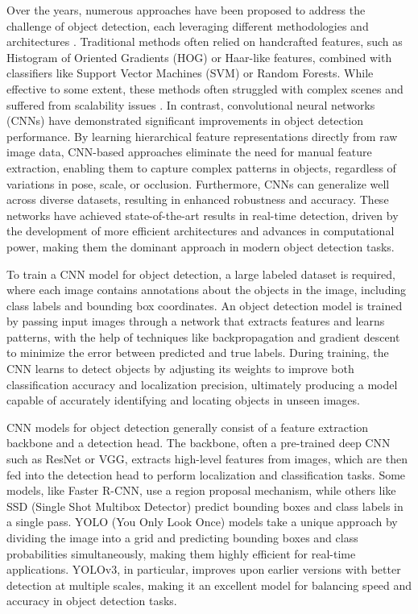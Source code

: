 \documentclass[journal,onecolumn,12pt]{IEEEtran}
\begin{document}
Over the years, numerous approaches have been proposed to address the challenge of object detection, each leveraging different methodologies and architectures \cite{zou2023object}. Traditional methods often relied on handcrafted features, such as Histogram of Oriented Gradients (HOG) or Haar-like features, combined with classifiers like Support Vector Machines (SVM) or Random Forests. While effective to some extent, these methods often struggled with complex scenes and suffered from scalability issues \cite{10099639}. In contrast, convolutional neural networks (CNNs) have demonstrated significant improvements in object detection performance. By learning hierarchical feature representations directly from raw image data, CNN-based approaches eliminate the need for manual feature extraction, enabling them to capture complex patterns in objects, regardless of variations in pose, scale, or occlusion. Furthermore, CNNs can generalize well across diverse datasets, resulting in enhanced robustness and accuracy. These networks have achieved state-of-the-art results in real-time detection, driven by the development of more efficient architectures and advances in computational power, making them the dominant approach in modern object detection tasks.

To train a CNN model for object detection, a large labeled dataset is required, where each image contains annotations about the objects in the image, including class labels and bounding box coordinates. An object detection model is trained by passing input images through a network that extracts features and learns patterns, with the help of techniques like backpropagation and gradient descent to minimize the error between predicted and true labels. During training, the CNN learns to detect objects by adjusting its weights to improve both classification accuracy and localization precision, ultimately producing a model capable of accurately identifying and locating objects in unseen images.

CNN models for object detection generally consist of a feature extraction backbone and a detection head. The backbone, often a pre-trained deep CNN such as ResNet or VGG, extracts high-level features from images, which are then fed into the detection head to perform localization and classification tasks. Some models, like Faster R-CNN, use a region proposal mechanism, while others like SSD (Single Shot Multibox Detector) predict bounding boxes and class labels in a single pass. YOLO (You Only Look Once) models take a unique approach by dividing the image into a grid and predicting bounding boxes and class probabilities simultaneously, making them highly efficient for real-time applications. YOLOv3, in particular, improves upon earlier versions with better detection at multiple scales, making it an excellent model for balancing speed and accuracy in object detection tasks.
\end{document}
